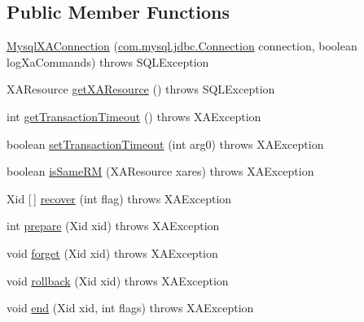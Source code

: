 \subsection*{Public Member Functions}
\begin{DoxyCompactItemize}
\item 
\mbox{\hyperlink{classcom_1_1mysql_1_1jdbc_1_1jdbc2_1_1optional_1_1_mysql_x_a_connection_adb324e1831acfb5a867780a35d8c95a0}{Mysql\+X\+A\+Connection}} (\mbox{\hyperlink{interfacecom_1_1mysql_1_1jdbc_1_1_connection}{com.\+mysql.\+jdbc.\+Connection}} connection, boolean log\+Xa\+Commands)  throws S\+Q\+L\+Exception 
\item 
X\+A\+Resource \mbox{\hyperlink{classcom_1_1mysql_1_1jdbc_1_1jdbc2_1_1optional_1_1_mysql_x_a_connection_a7af72f218de2585effac3636eb6b1cec}{get\+X\+A\+Resource}} ()  throws S\+Q\+L\+Exception 
\item 
int \mbox{\hyperlink{classcom_1_1mysql_1_1jdbc_1_1jdbc2_1_1optional_1_1_mysql_x_a_connection_aa09db65cb5575dd6396924f5967f7f6f}{get\+Transaction\+Timeout}} ()  throws X\+A\+Exception 
\item 
boolean \mbox{\hyperlink{classcom_1_1mysql_1_1jdbc_1_1jdbc2_1_1optional_1_1_mysql_x_a_connection_a8daf9a2f37693ad1f9e8b83bcb46b1db}{set\+Transaction\+Timeout}} (int arg0)  throws X\+A\+Exception 
\item 
boolean \mbox{\hyperlink{classcom_1_1mysql_1_1jdbc_1_1jdbc2_1_1optional_1_1_mysql_x_a_connection_a352f65f22228587f43c93e280c679496}{is\+Same\+RM}} (X\+A\+Resource xares)  throws X\+A\+Exception 
\item 
Xid \mbox{[}$\,$\mbox{]} \mbox{\hyperlink{classcom_1_1mysql_1_1jdbc_1_1jdbc2_1_1optional_1_1_mysql_x_a_connection_addc214698fd02360fd129159f4485e65}{recover}} (int flag)  throws X\+A\+Exception 
\item 
int \mbox{\hyperlink{classcom_1_1mysql_1_1jdbc_1_1jdbc2_1_1optional_1_1_mysql_x_a_connection_a6321a959e44d23678afc54a8c2f9828f}{prepare}} (Xid xid)  throws X\+A\+Exception 
\item 
void \mbox{\hyperlink{classcom_1_1mysql_1_1jdbc_1_1jdbc2_1_1optional_1_1_mysql_x_a_connection_a286ccbfb959c94172ea24b4aace83961}{forget}} (Xid xid)  throws X\+A\+Exception 
\item 
void \mbox{\hyperlink{classcom_1_1mysql_1_1jdbc_1_1jdbc2_1_1optional_1_1_mysql_x_a_connection_ae3f99ed779f888fbf58e1c447862a962}{rollback}} (Xid xid)  throws X\+A\+Exception 
\item 
void \mbox{\hyperlink{classcom_1_1mysql_1_1jdbc_1_1jdbc2_1_1optional_1_1_mysql_x_a_connection_ad446fd4ef97424ed837f11269a6da6f6}{end}} (Xid xid, int flags)  throws X\+A\+Exception 

\end{DoxyCompactItemize}
